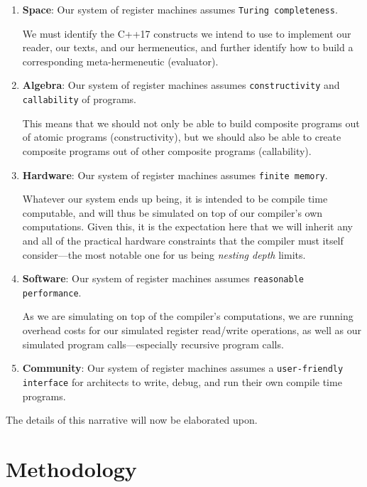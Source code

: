 \documentclass[twoside]{article}
\newcommand{\strong}[1]{{\bfseries #1}}
\begin{document}
\begin{enumerate}

\item \strong{Space}: Our system of register machines assumes \texttt{Turing completeness}.

We must identify the C++17 constructs we intend to use to implement our reader, our texts, and our hermeneutics,
and further identify how to build a corresponding meta-hermeneutic (evaluator).

\item \strong{Algebra}: Our system of register machines assumes \texttt{constructivity} and \texttt{callability} of programs.

This means that we should not only be able to build composite programs out of atomic programs (constructivity), but we should
also be able to create composite programs out of other composite programs (callability).

\item \strong{Hardware}: Our system of register machines assumes \texttt{finite memory}.

Whatever our system ends up being, it is intended to be compile time computable, and will thus be simulated on top of
our compiler's own computations. Given this, it is the expectation here that we will inherit any and all of the practical
hardware constraints that the compiler must itself consider---the most notable one for us being \emph{nesting depth} limits.

\item \strong{Software}: Our system of register machines assumes \texttt{reasonable performance}.

As we are simulating on top of the compiler's computations, we are running overhead costs for our simulated register
read/write operations, as well as our simulated program calls---especially recursive program calls.

\item \strong{Community}: Our system of register machines assumes a \texttt{user-friendly interface} for architects to write,
debug, and run their own compile time programs.

\end{enumerate}
The details of this narrative will now be elaborated upon.

\section*{Methodology}
\end{document}

